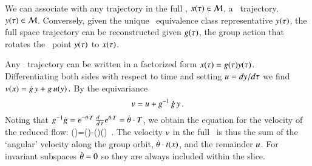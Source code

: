 

We can associate with any trajectory in the full \statesp, $x(\tau)
\in {\cal M}$, a \reducedsp\ trajectory, $y(\tau) \in {\cal M}$. Conversely,
given the unique \reducedsp\ equivalence class representative
$y(\tau)$, the full space trajectory can be reconstructed given
$g(\tau)$, the group action that rotates the \reducedsp\ point
$y(\tau)$  to $x(\tau)$.

Any \statesp\ trajectory can be written in a factorized
form $x(\tau)=g(\tau)
y(\tau)$. Differentiating both sides with respect to time and
setting $u={dy}/{d\tau}$ we find
\(
v(x)=\dot{g} \, y+g \, u(y)
\,.
\)
By the equivariance 
\[
v=u + g^{-1} \, \dot{g} \, y
\,.
\]
Noting that $g^{-1}\dot{g}=e^{-{\bf \theta} \cdot T} \,
\frac{d ~~}{d \, \tau} e^{{\bf \theta} \cdot T}=\dot{{\bf \theta}}\cdot T$,
we obtain the equation for the velocity of the reduced flow:
\beq
\velRed(\sspRed)=\vel(\sspRed)-\dot{\gSpace}(\sspRed)\cdot \groupTan(\sspRed)
\,.
The velocity $v$ in the full \statesp\ is thus the sum of the
`angular' velocity  along the group orbit,
$\dot{{\bf \theta}} \cdot t(x)$, and the remainder $u$. For
invariant subspaces $\dot{{\bf \theta}}=0$ so they are always included within
the slice.

